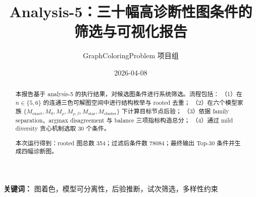 \title{Analysis-5：三十幅高诊断性图条件的筛选与可视化报告}
\author{GraphColoringProblem 项目组}
\date{2026-04-08}
\maketitle

\begin{abstract}
本报告基于 analysis-5 的执行结果，对候选图条件进行系统筛选。流程包括：
（1）在 $n\in\{5,6\}$ 的连通三色可解图空间中进行结构枚举与 rooted 去重；
（2）在六个模型家族
$\{M_{\mathrm{exact}},M_0,M_{\rho},M_{\rho,\beta},M_{\mathrm{star}},M_{\mathrm{cluster}}\}$
下计算目标节点后验；
（3）依据 family separation、argmax disagreement 与 balance 三项指标构造总分；
（4）通过 mild diversity 贪心机制选取 30 个条件。

本次运行得到：rooted 图总数 354；过滤后条件数 78084；最终输出 Top-30 条件并生成四幅诊断图。
\end{abstract}

\noindent\textbf{关键词：}
图着色，模型可分离性，后验推断，试次筛选，多样性约束
